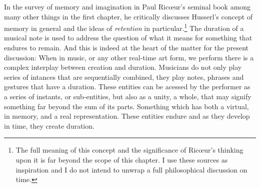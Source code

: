 In the survey of memory and imagination in Paul Ric{\oe}ur's seminal book  among many other things in the first chapter, he critically discusses Husserl's concept of memory in general and the ideas of \emph{retention} in particular.\footnote{The full meaning of this concept and the significance of Ric{\oe}ur's thinking upon it is far beyond the scope of this chapter. I use these sources as inspiration and I do not intend to unwrap a full philosophical discussion on time.} The duration of a musical note is used to address the question of what it means for something that endures to remain. And this is indeed at the heart of the matter for the present discussion: When in music, or any other real-time art form, we perform there is a complex interplay between creation and duration. Musicians do not only play series of intances that are sequentially combined, they play notes, phrases and gestures that have a duration. These entities can be acessed by the performer as a series of instants, or sub-entities, but also as a unity, a whole, that may signify something far beyond the sum of its parts. Something which has both a virtual, in memory, and a real representation. These entities endure and as they develop in time, they create duration.

